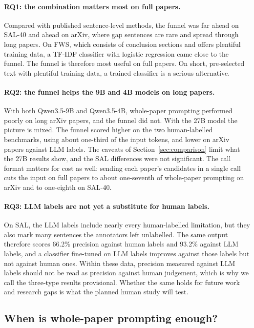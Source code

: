 \paragraph{RQ1: the combination matters most on full papers.} Compared with published sentence-level methods, the funnel was far ahead on SAL-40 and ahead on arXiv, where gap sentences are rare and spread through long papers. On FWS, which consists of conclusion sections and offers plentiful training data, a TF-IDF classifier with logistic regression came close to the funnel. The funnel is therefore most useful on full papers. On short, pre-selected text with plentiful training data, a trained classifier is a serious alternative.

\paragraph{RQ2: the funnel helps the 9B and 4B models on long papers.} With both Qwen3.5-9B and Qwen3.5-4B, whole-paper prompting performed poorly on long arXiv papers, and the funnel did not. With the 27B model the picture is mixed. The funnel scored higher on the two human-labelled benchmarks, using about one-third of the input tokens, and lower on arXiv papers against LLM labels. The caveats of Section~\ref{sec:comparison} limit what the 27B results show, and the SAL differences were not significant. The call format matters for cost as well: sending each paper's candidates in a single call cuts the input on full papers to about one-seventh of whole-paper prompting on arXiv and to one-eighth on SAL-40.

\paragraph{RQ3: LLM labels are not yet a substitute for human labels.} On SAL, the LLM labels include nearly every human-labelled limitation, but they also mark many sentences the annotators left unlabelled. The same output therefore scores 66.2\% precision against human labels and 93.2\% against LLM labels, and a classifier fine-tuned on LLM labels improves against those labels but not against human ones. Within these data, precision measured against LLM labels should not be read as precision against human judgement, which is why we call the three-type results provisional. Whether the same holds for future work and research gaps is what the planned human study will test.

\subsection{When is whole-paper prompting enough?}
\label{sec:whole-discussion}

